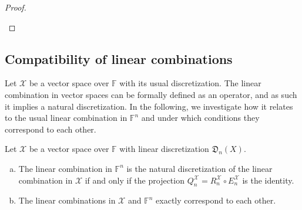 \documentclass[a4paper]{paper}
\newcommand*{\SPC}[1]{{\ensuremath{\mathscr{#1}}}}
\newcommand*{\SPCX}{\SPC{X}}
\newcommand*{\FIELD}{{\ensuremath{\mathbb{F}}}}
\newcommand*{\Fn}{{\ensuremath{\FIELD^n}}}
\newcommand*{\EXT}[2]{\ensuremath{E_{#1}^{#2}}}
\newcommand*{\REST}[2]{\ensuremath{R_{#1}^{#2}}}
\newcommand*{\COPROJ}[2]{\ensuremath{Q_{#1}^{#2}}}
\newcommand*{\RnX}{{\ensuremath{\REST{n}{\SPC{X}}}}}
\newcommand*{\EnX}{{\ensuremath{\EXT{n}{\SPC{X}}}}}
\newcommand*{\QnX}{{\ensuremath{\COPROJ{n}{\SPCX}}}}
\newcommand*{\DISCR}[2]{{\ensuremath{\mathfrak{D}_{#1}(#2)}}}
\newcommand*{\DISCRnX}{\DISCR{n}{X}}
\begin{document}
\begin{proof}
\begin{enumerate}[(a)]
 \end{enumerate}
\end{proof}



\subsection{Compatibility of linear combinations}
\label{subsec:prop:lincomb}

Let $\SPCX$ be a vector space over $\FIELD$ with its usual discretization. The linear combination in vector spaces 
can be formally defined as an operator, and as such it implies a natural discretization. In the following, we 
investigate how it relates to the usual linear combination in $\Fn$ and under which conditions they correspond to 
each other.


\begin{lemma}
 \label{lemma:prop:lincomb:natural_corresp}
 Let $\SPCX$ be a vector space over $\FIELD$ with linear discretization $\DISCRnX$.
 \begin{enumerate}[(a)]
  \item The linear combination in $\Fn$ is the natural discretization of the linear combination in $\SPCX$ if 
  and only if the projection $\QnX = \RnX \circ \EnX$ is the identity.
  
  \item The linear combinations in $\SPCX$ and $\Fn$ exactly correspond to each other.
 \end{enumerate}
\end{lemma}
\vspace{1em}
\end{document}

